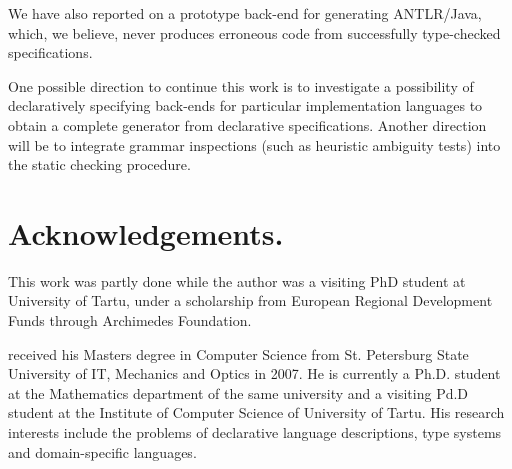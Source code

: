 \documentclass{informat} %
\newcommand{\tool}[1]{\textsc{#1}}
\begin{document}
We have also reported on a prototype back-end for generating \tool{ANTLR}/Java, which, we believe, never produces erroneous code from successfully type-checked specifications.

One possible direction to continue this work is to investigate a possibility of declaratively specifying back-ends for particular implementation languages to obtain a complete generator from declarative specifications. Another direction will be to integrate grammar inspections (such as heuristic ambiguity tests) into the static checking procedure.


\section*{Acknowledgements.}
This work was partly done while the author was a visiting PhD student at University of Tartu, under a scholarship from European Regional Development Funds through Archimedes Foundation.

%
%


\begin{backmatter}
\begin{biography}
\author{A. Breslav} received his Masters degree in Computer Science from St. Petersburg State University of IT, Mechanics and Optics in 2007. He is currently a Ph.D. student at the Mathematics department of the same university and a visiting Pd.D student at the Institute of Computer Science of University of Tartu. His research interests include the problems of declarative language descriptions, type systems and domain-specific languages.
\end{biography}

\end{backmatter}
\end{document}
